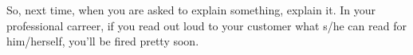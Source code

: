 \begin{exercise}[1.5]
\begin{solution}
  So, next time, when you are asked to explain something, explain it.
  In your professional carreer, if you read out loud to your customer what s/he can read for him/herself, you'll be fired pretty soon.
\end{solution}
\end{exercise}
